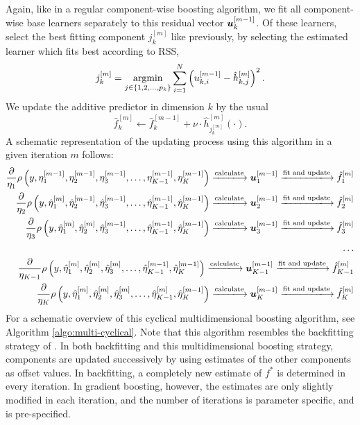 Again, like in a regular component-wise boosting algorithm, we fit all component-wise base learners separately to this residual vector $\bm{u}_k^{[m-1]}$.
Of these learners, select the best fitting component $j_k^{[m]}$ like previously, by selecting the estimated learner which fits best according to RSS,
\begin{equation*}
    j_k^{[m]}=\operatorname*{argmin}_{j\in\{1,2,\ldots,p_k\}}\sum_{i=1}^N \left(u_{k,i}^{[m-1]}-\hat{h}_{k,j}^{[m]}\right)^2.
\end{equation*}
We update the additive predictor in dimension $k$ by the usual
\begin{equation*}
    \hat{f}_k^{[m]}\gets\hat{f}_k^{[m-1]}+\nu\cdot \hat{h}^{[m]}_{j_k^{[m]}}(\cdot).
\end{equation*}
A schematic representation of the updating process using this algorithm in a given iteration $m$ follows:
\begin{align*}
    \frac{\partial}{\eta_1}\rho\left(y,\eta_1^{[m-1]},\eta_2^{[m-1]},\eta_3^{[m-1]},\ldots,\eta_{K-1}^{[m-1]},\eta_K^{[m-1]}\right)
    \xlongrightarrow{\text{calculate}}\u_{1}^{[m-1]}
    \xlongrightarrow{\text{fit and update}}\hat{f}_{1}^{[m]} \\
    \frac{\partial}{\eta_2}\rho\left(y,\hat{\eta}_1^{[m]},\hat{\eta}_2^{[m-1]},\hat{\eta}_3^{[m-1]},\ldots,\hat{\eta}_{K-1}^{[m-1]},\hat{\eta}_K^{[m-1]}\right)
    \xlongrightarrow{\text{calculate}} \u_{2}^{[m-1]}
    \xlongrightarrow{\text{fit and update}}\hat{f}_{2}^{[m]} \\
    \frac{\partial}{\eta_3}\rho\left(y,\hat{\eta}_1^{[m]},\hat{\eta}_2^{[m]},\hat{\eta}_3^{[m-1]},\ldots,\hat{\eta}_{K-1}^{[m-1]},\hat{\eta}_K^{[m-1]}\right)
    \xlongrightarrow{\text{calculate}}\u_{3}^{[m-1]}
    \xlongrightarrow{\text{fit and update}}\hat{f}_{3}^{[m]} \\
    \ldots\\
    \frac{\partial}{\eta_{K-1}}\rho\left(y,\hat{\eta}_1^{[m]},\hat{\eta}_2^{[m]},\hat{\eta}_3^{[m]},\ldots,\hat{\eta}_{K-1}^{[m-1]},\hat{\eta}_K^{[m-1]}\right)
    \xlongrightarrow{\text{calculate}}\u_{K-1}^{[m-1]}
    \xlongrightarrow{\text{fit and update}}\hat{f}_{K-1}^{[m]} \\
    \frac{\partial}{\eta_K}\rho\left(y,\hat{\eta}_1^{[m]},\hat{\eta}_2^{[m]},\hat{\eta}_3^{[m]},\ldots,\hat{\eta}_{K-1}^{[m]},\hat{\eta}_K^{[m-1]}\right)
    \xlongrightarrow{\text{calculate}}\u_{K}^{[m-1]}
    \xlongrightarrow{\text{fit and update}}\hat{f}_{K}^{[m]}
\end{align*}
For a schematic overview of this cyclical multidimensional boosting algorithm, see Algorithm \ref{algo:multi-cyclical}.
Note that this algorithm resembles the backfitting strategy of \citet{hastie1986}.
In both backfitting and this multidimensional boosting strategy, components are updated successively by using estimates of the other components as offset values.
In backfitting, a completely new estimate of $f^*$ is determined in every iteration.
In gradient boosting, however, the estimates are only slightly modified in each iteration, and the number of iterations is parameter specific, and is pre-specified.

